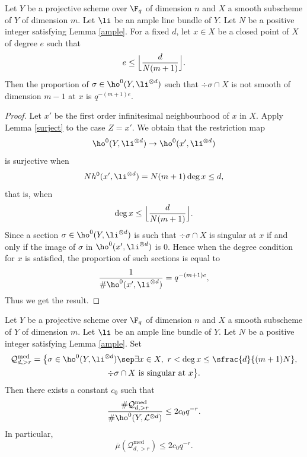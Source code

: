 
\begin{lem}\label{singpt}
Let $Y$ be a projective scheme over $\F_q$ of dimension $n$ and $X$ a smooth subscheme of $Y$ of dimension $m$. Let $\li$ be an ample line bundle of $Y$. Let $N$ be a positive integer satisfying Lemma \ref{ample}. For a fixed $d$, let $x\in X$ be a closed point of $X$ of degree $e$ such that
\[
e\leq \Bigl\lfloor \frac{d}{N(m+1)} \Bigr\rfloor.
\]
Then the proportion of $\sigma\in \ho^0(Y, \li^{\otimes d})$ such that $\div \sigma\cap X$ is not smooth of dimension $m-1$ at $x$ is $q^{-(m+1)e}$.
\end{lem}
\begin{proof}
Let $x'$ be the first order infinitesimal neighbourhood of $x$ in $X$. Apply Lemma \ref{surject} to the case $Z=x'$. We obtain that the restriction map
\[
\ho^0(Y, \li^{\otimes d})\to \ho^0(x', \li^{\otimes d})
\]
is surjective when
\[
Nh^0(x', \li^{\otimes d})=N(m+1)\deg x\leq d,
\]
that is, when
\[
\deg x\leq \Bigl\lfloor \frac{d}{N(m+1)} \Bigr\rfloor.
\]
Since a section $\sigma\in \ho^0(Y, \li^{\otimes d})$ is such that $\div \sigma\cap X$ is singular at $x$ if and only if the image of $\sigma$ in $\ho^0(x', \li^{\otimes d})$ is $0$. Hence when the degree condition for $x$ is satisfied, the proportion of such sections is equal to
\[
\frac{1}{\#\ho^0(x', \li^{\otimes d})}=q^{-(m+1)e},
\]
Thus we get the result.
\end{proof}
\begin{prop} \label{mediumf}
Let $Y$ be a projective scheme over $\F_q$ of dimension $n$ and $X$ a smooth subscheme of $Y$ of dimension $m$. Let $\li$ be an ample line bundle of $Y$. Let $N$ be a positive integer satisfying Lemma \ref{ample}. Set\vspace*{-3pt}
\begin{multline*}
\mathcal{Q}_{d, >r}^{\mathrm{med}} = \bigl\{ \sigma\in \ho^0(Y,\li^{\otimes d})\sep \exists x\in X,\ r<\deg x\leq \sfrac{d}{(m+1)N},\\ \div \sigma\cap X \text{ is singular at }x \bigl\}.
\end{multline*}
Then there exists a constant $c_0$ such that
\[
\frac{\#\mathcal{Q}_{d, >r}^{\mathrm{med}}}{\# \ho^0(Y, \mathcal{L}^{\otimes d})} \leq 2c_0q^{-r}.
\]
In particular,\vspace*{-3pt}
\[
\overline{\mu}(\mathcal{Q}_{d, >r}^{\mathrm{med}})\leq 2c_0q^{-r}.
\]
\end{prop}
